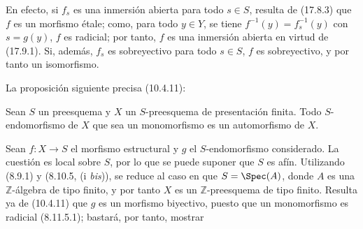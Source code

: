 En efecto, si $f_s$ es una inmersión abierta para todo $s\in S$, resulta de (17.8.3) que $f$ es un morfismo étale; como, para todo $y\in Y$, se tiene $f^{-1}(y)=f_s^{-1}(y)$ con $s=g(y)$, $f$ es radicial; por tanto, $f$ es una inmersión abierta en virtud de (17.9.1). Si, además, $f_s$ es sobreyectivo para todo $s\in S$, $f$ es sobreyectivo, y por tanto un isomorfismo.

La proposición siguiente precisa (10.4.11):

\begin{proposition}[17.9.6]
\label{IV.17.9.6}
Sean $S$ un preesquema y $X$ un $S$-preesquema de presentación finita. Todo $S$-endomorfismo de $X$ que sea un monomorfismo es un automorfismo de $X$.
\end{proposition}

Sean $f:X\to S$ el morfismo estructural y $g$ el $S$-endomorfismo considerado. La cuestión es local sobre $S$, por lo que se puede suponer que $S$ es afín. Utilizando (8.9.1) y (8.10.5, (i \emph{bis})), se reduce al caso en que $S=\Spec(A)$, donde $A$ es una $\mathbb{Z}$-álgebra de tipo finito, y por tanto $X$ es un $\mathbb{Z}$-preesquema de tipo finito. Resulta ya de (10.4.11) que $g$ es un morfismo biyectivo, puesto que un monomorfismo es radicial (8.11.5.1); bastará, por tanto, mostrar


